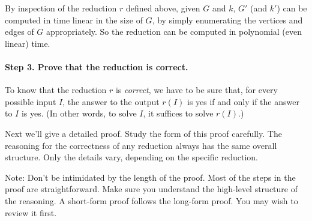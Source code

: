 By inspection of the reduction $r$ defined above, given $G$ and $k$, 
$G'$ (and $k'$) can be computed in time linear in the size of $G$,
by simply enumerating the vertices and edges of $G$ appropriately.
So the reduction can be computed in polynomial (even linear) time.

\paragraph{Step 3.  Prove that the reduction is correct.}
To know that the reduction $r$ is \emph{correct},
we have to be sure that, for every possible input $I$, 
the answer to the output $r(I)$ is \textsf{yes}
if and only if the answer to $I$ is \textsf{yes}.
(In other words, to solve $I$, it suffices to solve $r(I)$.)

Next we'll give a detailed proof.
Study the form of this proof carefully.
The reasoning for the correctness of any reduction
always has the same overall structure.
Only the details vary, depending on the specific reduction.

Note: Don't be intimidated by the length of the proof.
Most of the steps in the proof are straightforward.
Make sure you understand the high-level structure of the reasoning.
A short-form proof follows the long-form proof.  You may wish to review it first.


